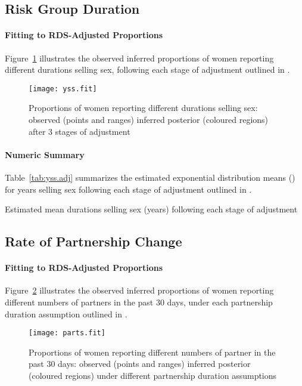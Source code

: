 \subsection{Risk Group Duration}\label{app.yss}
\paragraph{Fitting to RDS-Adjusted Proportions}
Figure~\ref{fig:yss.fit} illustrates
the observed \vs inferred proportions of women reporting
different durations selling sex,
following each stage of adjustment outlined in .
\begin{figure}[h]
  \centering\texttt{[image: yss.fit]}
  \caption{Proportions of women reporting different durations selling sex:
    observed (points and ranges) \vs inferred posterior (coloured regions)
    after 3 stages of adjustment}
  \label{fig:yss.fit}
\end{figure}
\paragraph{Numeric Summary}
Table~\ref{tab:yss.adj} summarizes the estimated exponential distribution means (\ci)
for years selling sex following each stage of adjustment outlined in .
\begin{table}[h]
  \centering
  \caption{Estimated mean durations selling sex (years) following each stage of adjustment}
  \label{tab:yss.adj}
  
\end{table}
\subsection{Rate of Partnership Change}\label{app.parts}
\paragraph{Fitting to RDS-Adjusted Proportions}
Figure~\ref{fig:parts.fit} illustrates
the observed \vs inferred proportions of women reporting
different numbers of partners in the past 30 days,
under each partnership duration assumption outlined in .
\begin{figure}[h]
  \centering\texttt{[image: parts.fit]}
  \caption{Proportions of women reporting different numbers of partner in the past 30 days:
    observed (points and ranges) \vs inferred posterior (coloured regions)
    under different partnership duration assumptions}
  \label{fig:parts.fit}
\end{figure}

